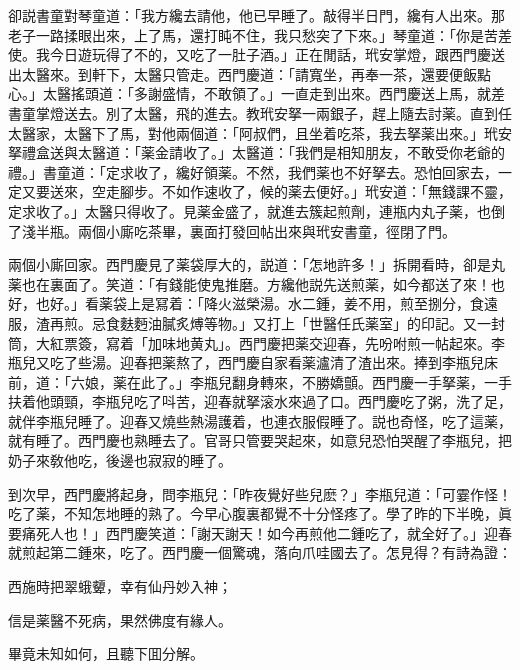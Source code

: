 卻説書童對琴童道：「我方纔去請他，他已早睡了。敲得半日門，纔有人出來。那老子一路揉眼出來，上了馬，還打盹不住，我只愁突了下來。」琴童道：「你是苦差使。我今日遊玩得了不的，又吃了一肚子酒。」正在閒話，玳安掌燈，跟西門慶送出太醫來。到軒下，太醫只管走。西門慶道：「請寬坐，再奉一茶，還要便飯點心。」太醫搖頭道：「多謝盛情，不敢領了。」一直走到出來。西門慶送上馬，就差書童掌燈送去。別了太醫，飛的進去。教玳安拏一兩銀子，趕上隨去討薬。直到任太醫家，太醫下了馬，對他兩個道：「阿叔們，且坐着吃茶，我去拏薬出來。」玳安拏禮盒送與太醫道：「薬金請收了。」太醫道：「我們是相知朋友，不敢受你老爺的禮。」書童道：「定求收了，纔好領薬。不然，我們薬也不好拏去。恐怕回家去，一定又要送來，空走腳步。不如作速收了，候的薬去便好。」玳安道：「無錢課不靈，定求收了。」太醫只得收了。見薬金盛了，就進去簇起煎劑，連瓶内丸子薬，也倒了淺半瓶。兩個小廝吃茶畢，裏面打發回帖出來與玳安書童，徑閉了門。

兩個小廝回家。西門慶見了薬袋厚大的，説道：「怎地許多！」拆開看時，卻是丸薬也在裏面了。笑道：「有錢能使鬼推磨。方纔他説先送煎薬，如今都送了來！也好，也好。」看薬袋上是冩着：「降火滋榮湯。水二鍾，姜不用，煎至捌分，食遠服，渣再煎。忌食麩麪油膩炙煿等物。」又打上「世醫任氏薬室」的印記。又一封筒，大紅票簽，寫着「加味地黄丸」。西門慶把薬交迎春，先吩咐煎一帖起來。李瓶兒又吃了些湯。迎春把薬熬了，西門慶自家看薬瀘清了渣出來。捧到李瓶兒床前，道：「六娘，薬在此了。」李瓶兒翻身轉來，不勝嬌顫。西門慶一手拏薬，一手扶着他頭頸，李瓶兒吃了呌苦，迎春就拏滚水來過了口。西門慶吃了粥，洗了足，就伴李瓶兒睡了。迎春又燒些熱湯護着，也連衣服假睡了。説也奇怪，吃了這薬，就有睡了。西門慶也熟睡去了。官哥只管要哭起來，如意兒恐怕哭醒了李瓶兒，把奶子來敎他吃，後邊也寂寂的睡了。

到次早，西門慶將起身，問李瓶兒：「昨夜覺好些兒麽？」李瓶兒道：「可霎作怪！吃了薬，不知怎地睡的熟了。今早心腹裏都覺不十分怪疼了。學了昨的下半晚，眞要痛死人也！」西門慶笑道：「謝天謝天！如今再煎他二鍾吃了，就全好了。」迎春就煎起第二鍾來，吃了。西門慶一個驚魂，落向爪哇國去了。怎見得？有詩為證：

\begin{myquote}
西施時把翠蛾顰，幸有仙丹妙入神；

信是薬醫不死病，果然佛度有緣人。
\end{myquote}

畢竟未知如何，且聽下囬分解。

